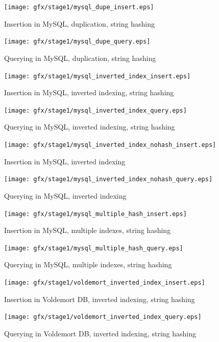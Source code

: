\begin{figure}
    \centering
    \texttt{[image: gfx/stage1/mysql\_dupe\_insert.eps]}
    \caption{Insertion in MySQL, duplication, string hashing}
\end{figure}
\begin{figure}
    \centering
    \texttt{[image: gfx/stage1/mysql\_dupe\_query.eps]}
    \caption{Querying in MySQL, duplication, string hashing}
\end{figure}
\clearpage

\begin{figure}
    \centering
    \texttt{[image: gfx/stage1/mysql\_inverted\_index\_insert.eps]}
    \caption{Insertion in MySQL, inverted indexing, string hashing}
\end{figure}
\begin{figure}
    \centering
    \texttt{[image: gfx/stage1/mysql\_inverted\_index\_query.eps]}
    \caption{Querying in MySQL, inverted indexing, string hashing}
\end{figure}
\clearpage

\begin{figure}
    \centering
    \texttt{[image: gfx/stage1/mysql\_inverted\_index\_nohash\_insert.eps]}
    \caption{Insertion in MySQL, inverted indexing}
\end{figure}
\begin{figure}
    \centering
    \texttt{[image: gfx/stage1/mysql\_inverted\_index\_nohash\_query.eps]}
    \caption{Querying in MySQL, inverted indexing}
\end{figure}
\clearpage

\begin{figure}
    \centering
    \texttt{[image: gfx/stage1/mysql\_multiple\_hash\_insert.eps]}
    \caption{Insertion in MySQL, multiple indexes, string hashing}
\end{figure}
\begin{figure}
    \centering
    \texttt{[image: gfx/stage1/mysql\_multiple\_hash\_query.eps]}
    \caption{Querying in MySQL, multiple indexes, string hashing}
\end{figure}
\clearpage

\begin{figure}
    \centering
    \texttt{[image: gfx/stage1/voldemort\_inverted\_index\_insert.eps]}
    \caption{Insertion in Voldemort DB, inverted indexing, string hashing}
\end{figure}
\begin{figure}
    \centering
    \texttt{[image: gfx/stage1/voldemort\_inverted\_index\_query.eps]}
    \caption{Querying in Voldemort DB, inverted indexing, string hashing}
\end{figure}
\clearpage

